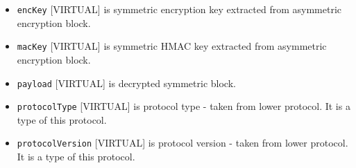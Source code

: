 \documentclass[a4paper,10pt]{article}
\begin{document}
\begin{itemize}
Note that it is a symmetric technique so attacker can still create packets with valid HMAC. Digital signature 
has to be verified (mac key is signed as well).

\begin{itemize}
 \item \verb#protocolType#
 \item \verb#protocolVersion#
 \item \verb#ampType#
 \item \verb#ampVersion#
 \item \verb#sequenceNumber#
 \item \verb#randomNonce#
 \item \verb#sender#
 \item \verb#destination#
 \item \verb#destinationType#
 \item \verb#iv#, initialization vector for symmetric encryption.
 \item \verb#encKey01#, symmetric encryption key for the symmetric encryption block.
 \item \verb#macKey01#, hmac symmetric key.
 \item \verb#easymBlock#
 \item \verb#easymBlockVersion#
 \item \verb#esymBlock#
 \item \verb#esymBlockVersion#
\end{itemize}
  
$
hmac = HMAC(macKey01, protocolType:protocolVersion:ampType:ampVersion:sequenceNumber:randomNonce:sender:
destination:destinationType:iv:encKey01:macKey01:easymBlock:easymBlockVersion:esymBlock:esymBlockVersion)) 
$

\textbf{Update v2}: hmac now includes \verb#messageSentMiliUTC#;

\item \verb#encKey# [VIRTUAL] is symmetric encryption key extracted from asymmetric encryption block. 

\item \verb#macKey# [VIRTUAL] is symmetric HMAC key extracted from asymmetric encryption block. 
 
\item \verb#payload# [VIRTUAL] is decrypted symmetric block.

\item \verb#protocolType# [VIRTUAL] is protocol type - taken from lower protocol. It is a type of this protocol.

\item \verb#protocolVersion# [VIRTUAL] is protocol version - taken from lower protocol. It is a type of this protocol.

\end{itemize}
\end{document}
